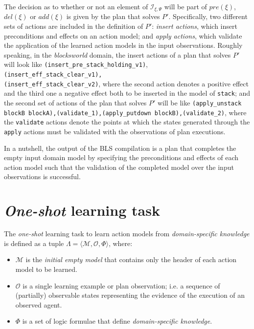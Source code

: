 \documentclass{article}
\newcommand{\tup}[1]{{\langle #1 \rangle}}
\begin{document}
The decision as to whether or not an element of ${\mathcal I}_{\xi,\Psi}$ will be part of $pre(\xi)$, $del(\xi)$ or $add(\xi)$ is given by the plan that solves $P'$. Specifically, two different sets of actions are included in the definition of $P'$: \emph{insert actions}, which insert preconditions and effects on an action model; and \emph{apply actions}, which validate the application of the learned action models in the input observations. Roughly speaking, in the \emph{blocksworld} domain, the insert actions of a plan that solves $P'$ will look like {\tt{\footnotesize(insert\_pre\_stack\_holding\_v1)}},\\
{\tt{\footnotesize(insert\_eff\_stack\_clear\_v1),\\
(insert\_eff\_stack\_clear\_v2)}}, where the second action denotes a positive effect and the third one a negative effect both to be inserted in the model of {\tt{\small stack}}; and the second set of actions of the plan that solves $P'$ will be like {\tt{\small (apply\_unstack blockB blockA),(validate\_1),(apply\_putdown blockB),(validate\_2)}}, where the {\tt {\small validate}} actions denote the points at which the states generated through the {\tt {\small apply}} actions must be validated with the observations of plan executions.

In a nutshell, the output of the BLS compilation is a plan that completes the empty input domain model by specifying the preconditions and effects of each action model such that the validation of the completed model over the input observations is successful.





\section{{\em One-shot} learning task}
\label{sec:learning}

The {\em one-shot} learning task to learn action models from {\em domain-specific knowledge} is defined as a tuple $\Lambda=\tup{\mathcal{M},{\mathcal O},\Phi}$, where:

\begin{itemize}
\item $\mathcal{M}$ is the {\em initial empty model} that contains only the header of each action model to be learned.
\item $\mathcal{O}$ is a single learning example or plan observation; i.e. a sequence of (partially) observable states representing the evidence of the execution of an observed agent.
\item $\Phi$ is a set of logic formulae that define {\em domain-specific knowledge}.
\end{itemize}
\end{document}

